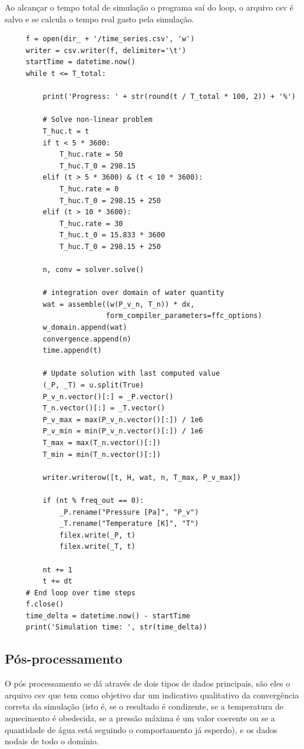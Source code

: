     Ao alcançar o tempo total de simulação o programa saí do loop, o arquivo csv
    é salvo e se calcula o tempo real gasto pela simulação.
    
     \begin{verbatim}
     f = open(dir_ + '/time_series.csv', 'w')
     writer = csv.writer(f, delimiter='\t')
     startTime = datetime.now()
     while t <= T_total:

         print('Progress: ' + str(round(t / T_total * 100, 2)) + '%')
     
         # Solve non-linear problem
         T_huc.t = t
         if t < 5 * 3600:
             T_huc.rate = 50
             T_huc.T_0 = 298.15
         elif (t > 5 * 3600) & (t < 10 * 3600):
             T_huc.rate = 0
             T_huc.T_0 = 298.15 + 250
         elif (t > 10 * 3600):
             T_huc.rate = 30
             T_huc.t_0 = 15.833 * 3600
             T_huc.T_0 = 298.15 + 250

         n, conv = solver.solve()

         # integration over domain of water quantity
         wat = assemble((w(P_v_n, T_n)) * dx,
                        form_compiler_parameters=ffc_options)
         w_domain.append(wat)
         convergence.append(n)
         time.append(t)

         # Update solution with last computed value
         (_P, _T) = u.split(True)
         P_v_n.vector()[:] = _P.vector()
         T_n.vector()[:] = _T.vector()
         P_v_max = max(P_v_n.vector()[:]) / 1e6
         P_v_min = min(P_v_n.vector()[:]) / 1e6
         T_max = max(T_n.vector()[:])
         T_min = min(T_n.vector()[:])

         writer.writerow([t, H, wat, n, T_max, P_v_max])

         if (nt % freq_out == 0):
             _P.rename("Pressure [Pa]", "P_v")
             _T.rename("Temperature [K]", "T")
             filex.write(_P, t)
             filex.write(_T, t)

         nt += 1
         t += dt
     # End loop over time steps
     f.close()
     time_delta = datetime.now() - startTime
     print('Simulation time: ', str(time_delta))
    \end{verbatim} 
   
    \subsection{Pós-processamento}
    O pós processamento se dá através de dois tipos de dados principais, são
    eles o arquivo csv que tem como objetivo dar um indicativo qualitativo da
    convergência correta da simulação (isto é, se o resultado é condizente, se a
    temperatura de aquecimento é obedecida, se a pressão máxima é um valor
    coerente ou se a quantidade de água está seguindo o comportamento já
    esperdo), e os dados nodais de todo o domínio.

